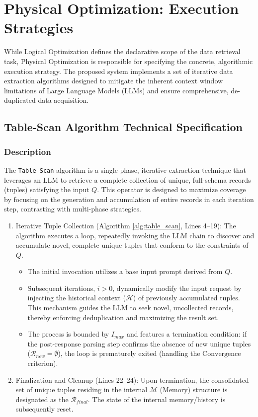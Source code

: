 \section{Physical Optimization: Execution Strategies}

While Logical Optimization defines the declarative scope of the data retrieval task, Physical Optimization is responsible for specifying the concrete, algorithmic execution strategy. The proposed system implements a set of iterative data extraction algorithms designed to mitigate the inherent context window limitations of Large Language Models (LLMs) and ensure comprehensive, de-duplicated data acquisition.

\subsection{Table-Scan Algorithm Technical Specification}

\subsubsection{Description}
The \texttt{Table-Scan} algorithm is a single-phase, iterative extraction technique that leverages an LLM to retrieve a complete collection of unique, full-schema records (tuples) satisfying the input $Q$. This operator is designed to maximize coverage by focusing on the generation and accumulation of entire records in each iteration step, contrasting with multi-phase strategies.

\begin{enumerate}
    \item Iterative Tuple Collection (Algorithm \ref{alg:table_scan}, Lines 4--19): The algorithm executes a loop, repeatedly invoking the LLM chain to discover and accumulate novel, complete unique tuples that conform to the constraints of $Q$.
    \begin{itemize}
        \item The initial invocation utilizes a base input prompt derived from $Q$.
        \item Subsequent iterations, $i > 0$, dynamically modify the input request by injecting the historical context ($\mathcal{H}$) of previously accumulated tuples. This mechanism guides the LLM to seek novel, uncollected records, thereby enforcing deduplication and maximizing the result set.
        \item The process is bounded by $I_{max}$ and features a termination condition: if the post-response parsing step confirms the absence of new unique tuples ($\mathcal{R}_{new} = \emptyset$), the loop is prematurely exited (handling the $\text{Convergence}$ criterion).
    \end{itemize}
    \item Finalization and Cleanup (Lines 22--24): Upon termination, the consolidated set of unique tuples residing in the internal $\mathcal{M}$ (Memory) structure is designated as the $\mathcal{R}_{final}$. The state of the internal memory/history is subsequently reset.
\end{enumerate}

